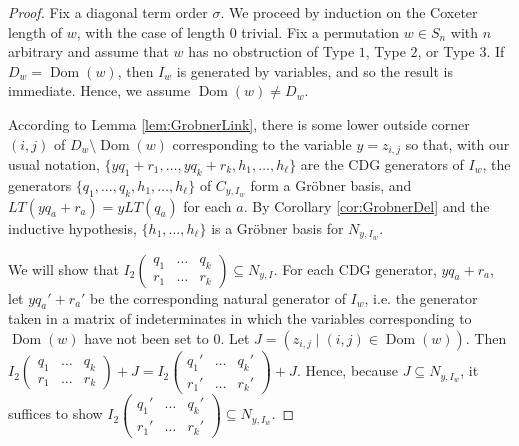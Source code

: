 \documentclass[ALCO,Unicode,published]{cedram}
\DeclareMathOperator{\Dom}{Dom}
\begin{document}
\begin{proof}
Fix a diagonal term order $\sigma$.  We proceed by induction on the Coxeter length of $w$, with the case of length $0$ trivial.  Fix a permutation $w \in S_n$ with $n$ arbitrary and assume that $w$ has no obstruction of Type $1$, Type  $2$, or Type $3$.  If $D_w = \Dom(w)$, then $I_w$ is generated by variables, and so the result is immediate.  Hence, we assume $\Dom(w) \neq D_w$.

According to Lemma \ref{lem:GrobnerLink}, there is some lower outside corner $(i,j)$ of $D_w \setminus \Dom(w)$ corresponding to the variable $y = z_{i,j}$ so that, with our usual notation, $\{yq_1+r_1,\dots, yq_k+r_k,h_1,\dots, h_\ell\}$ are the CDG generators of $I_w$, the generators $\{q_1, \ldots, q_k, h_1, \ldots, h_\ell\}$ of $C_{y,I_w}$ form a Gr\"obner basis, and $LT(yq_a+r_a) = yLT(q_a)$ for each $a$.  By Corollary \ref{cor:GrobnerDel} and the inductive hypothesis, $\{h_1, \ldots, h_\ell\}$ is a Gr\"obner basis for $N_{y,I_w}$.  

We will show that $I_2 \begin{pmatrix} q_1 & \ldots & q_k \\ r_1 & \ldots & r_k \end{pmatrix} \subseteq  N_{y,I}$.  For each CDG generator, $yq_a+r_a$, let $yq_a'+r_a'$ be the corresponding natural generator of $I_w$, i.e. the generator taken in a matrix of indeterminates in which the variables corresponding to $\Dom(w)$ have not been set to $0$.  Let $J = (z_{i,j} \mid (i,j) \in \Dom(w))$.  Then $I_2 \begin{pmatrix} q_1 & \ldots & q_k \\ r_1 & \ldots & r_k \end{pmatrix}+J= I_2 \begin{pmatrix} q_1' & \ldots & q_k' \\ r_1' & \ldots & r_k' \end{pmatrix}+J$.  Hence, because $J \subseteq N_{y,I_w}$, it suffices to show $I_2 \begin{pmatrix} q_1' & \ldots & q_k' \\ r_1' & \ldots & r_k' \end{pmatrix} \subseteq N_{y,I_w}$.  


\end{proof}
\end{document}
